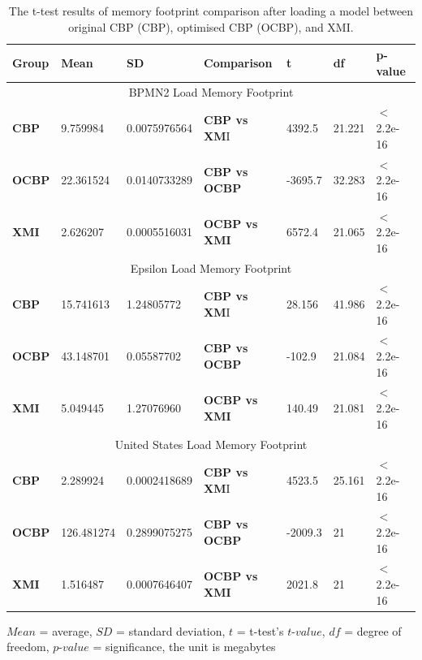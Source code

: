 \documentclass{llncs}
\begin{document}
     \begin{table}
        \small
        \centering
        \caption{The t-test results of memory footprint comparison after loading a model between original CBP (CBP), optimised CBP (OCBP), and XMI.}
        \label{table:ttest_results_load_memory}
        \begin{tabular}
            {|p{}|p{}|p{}|p{}|p{}|p{}|p{}|}
            \hline 
            
            \textbf{Group} & \textbf{Mean} & \textbf{SD} & \textbf{Comparison} & \textbf{t}  & \textbf{df} & \textbf{p-value} \\  
            \hline 
            \multicolumn{7}{|c|}{BPMN2 Load Memory Footprint} \\
            \hline 
            \textbf{CBP} & 9.759984     & 0.0075976564 & \textbf{CBP vs XM}I &  4392.5   & 21.221 & $<$ 2.2e-16 \\  
            \hline 
            \textbf{OCBP} & 22.361524   & 0.0140733289 & \textbf{CBP vs OCBP} & -3695.7 & 32.283  & $<$ 2.2e-16 \\  
            \hline 
            \textbf{XMI} &  2.626207   & 0.0005516031 & \textbf{OCBP vs XMI} &  6572.4    & 21.065  & $<$ 2.2e-16 \\ 
            \hline 
            
            \multicolumn{7}{|c|}{Epsilon Load Memory Footprint} \\
            \hline 
            \textbf{CBP} &15.741613    & 1.24805772 &  \textbf{CBP vs XM}I & 28.156   &  41.986 & $<$ 2.2e-16 \\
            \hline 
            \textbf{OCBP} & 43.148701   & 0.05587702 & \textbf{CBP vs OCBP} & -102.9 &21.084 & $<$ 2.2e-16 \\  
            \hline 
            \textbf{XMI} & 5.049445   & 1.27076960 & \textbf{OCBP vs XMI} & 140.49  & 21.081  & $<$ 2.2e-16 \\ 
            \hline 
            
            \multicolumn{7}{|c|}{United States Load Memory Footprint} \\
            \hline 
            \textbf{CBP} & 2.289924     & 0.0002418689 & \textbf{CBP vs XM}I &   4523.5   & 25.161 & $<$ 2.2e-16 \\ 
            \hline 
            \textbf{OCBP} & 126.481274   & 0.2899075275 & \textbf{CBP vs OCBP} &   -2009.3 & 21 & $<$ 2.2e-16 \\ 
            \hline 
            \textbf{XMI} &  1.516487  & 0.0007646407 & \textbf{OCBP vs XMI} &  2021.8  & 21 & $<$ 2.2e-16 \\ 
            \hline
        \end{tabular}
    \justify
    $Mean$ = average, $SD$ = standard deviation, $t$ = t-test's $t$-$value$, $df$ = degree of freedom, $p$-$value$ = significance, the unit is megabytes
    \end{table}
    
\end{document}
